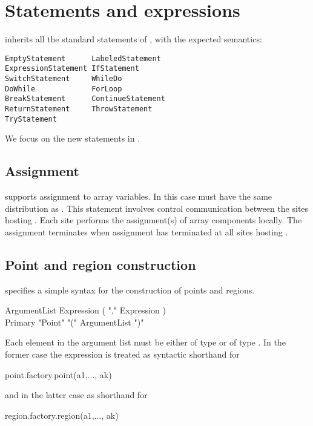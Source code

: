 \chapter{Statements and expressions}\label{XtenStatements}

\Xten{} inherits all the standard statements of \Java{}, with the expected semantics:

\begin{verbatim}
EmptyStatement      LabeledStatement  
ExpressionStatement IfStatement
SwitchStatement     WhileDo
DoWhile             ForLoop           
BreakStatement      ContinueStatement  
ReturnStatement     ThrowStatement
TryStatement
\end{verbatim}

We focus on the new statements in \Xten. 

\section{Assignment}\label{AssignmentStatement}

%

{}\Xten{} supports assignment  to array variables. In this
case  must have the same distribution  as . This
statement involves control communication between the sites hosting
. Each site performs the assignment(s) of array components
locally. The assignment terminates when assignment has terminated at
all sites hosting .


\section{Point and region construction}\label{point-syntax}
\Xten{} specifies a simple syntax for the construction of points and regions.
\begin{grammar}
ArgumentList \: Expression ( \xcd"," Expression )\star \\
Primary \: \xcd"Point" \xcd"(" ArgumentList \xcd")"
\end{grammar}
Each element in the argument list must be either of type  or 
of type . In the former case the expression 
 is treated as syntactic shorthand for
\begin{xten}
point.factory.point(a1,..., ak)
\end{xten}
\noindent and in the latter case as shorthand for
\begin{xten}
region.factory.region(a1,..., ak)
\end{xten}

